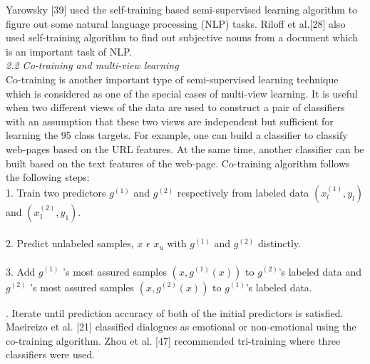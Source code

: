\documentclass{article}
\begin{document}
		Yarowsky [39] \cite{osman2004multi, fuhrmann1988fuzziness} used the self-training based semi-supervised learning algorithm to figure out some natural
		language processing (NLP) tasks. Riloff et al.[28] \cite{cardoso1998fuzziness, pal1983automatic, williams2006fuzziness} also used self-training algorithm to find out subjective nouns from a document which is an important task of NLP.\\[8pt]
		\textit{2.2 Co-training and multi-view learning}\\
		Co-training is another important type of semi-supervised learning technique which is considered as one of
		the special cases of multi-view learning. It is useful when two different views of the data are used to construct
		a pair of classifiers with an assumption that these two views are independent but sufficient for learning the
		95 class targets. For example, one can build a classifier to classify web-pages based on the URL features. At the
		same time, another classifier can be built based on the text features of the web-page. Co-training algorithm
		follows the following steps:\\ [8pt]
		1. Train two predictors $g^{(1)}$ and $g^{(2)}$ respectively from labeled data $(x_l^{(1)}, y_l)$ and $(x_1^{(2)}, y_1)$.\\\\
		2. Predict unlabeled samples, $x$ $\epsilon$ $x_u$ with $g^{(1)}$ and $g^{(2)}$ distinctly.\\\\
		3. Add $g^{(1)}$ ’s most assured samples $(x, g^{(1)}(x))$ to $g^{(2)}$’s labeled data and $g^{(2)}$ ’s most
		assured samples $(x, g^{(2)}(x))$ to $g^{(1)}$’s labeled data.
		
		. Iterate until prediction accuracy of both of the initial predictors is satisfied.\\
		
		Maeireizo et al. [21] \cite{knopfmacher1975measures} classified dialogues as emotional or non-emotional using the co-training algorithm.
		Zhou et al. [47] \cite{kacprzyk1995reliability, hawer2018guideline, miskei2017fuzziness} recommended tri-training where three classifiers were used.\\
		
\end{document}
